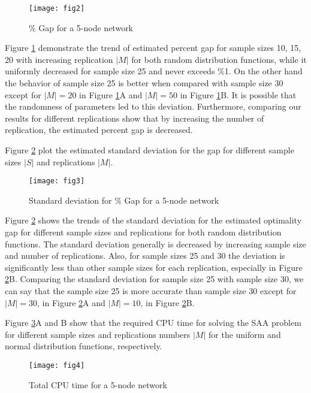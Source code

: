 \documentclass[review]{elsarticle}
\begin{document}
\begin{figure}[h!]
\centering
\texttt{[image: fig2]}
\caption{\% Gap for a 5-node network}\label{fig2}
\end{figure}


Figure \ref{fig2} demonstrate the trend of estimated percent gap for sample sizes 10, 15, 20 with increasing replication $|M|$ for both random distribution functions, while it uniformly decreased for sample size 25 and never exceeds \%1. On the other hand the behavior of sample size 25 is better when compared with sample size 30 except for $|M|=20$ in Figure \ref{fig2}A and $|M|=50$ in Figure \ref{fig2}B. It is possible that the randomness of parameters led to this deviation. Furthermore, comparing our results for different replications show that by increasing the number of replication, the estimated percent gap is decreased.

Figure \ref{fig3} plot the estimated standard deviation for the gap for different sample sizes $|S|$ and replications $|M|$.

\begin{figure}[h!]
\centering
\texttt{[image: fig3]}
\caption{Standard deviation for \% Gap for a 5-node network}\label{fig3}
\end{figure}

Figure \ref{fig3} shows the trends of the standard deviation for the estimated optimality gap for different sample sizes and replications for both random distribution functions. The standard deviation generally is decreased by increasing sample size and number of replications. Also, for sample sizes 25 and 30 the deviation is significantly less than other sample sizes for each replication, especially in Figure \ref{fig3}B. Comparing the standard deviation for sample size 25 with sample size 30, we can say that the sample size 25 is more accurate than sample size 30 except for $|M|=30$, in Figure \ref{fig3}A and $|M|=10$, in Figure \ref{fig3}B.

Figure \ref{fig4}A and B show that the required CPU time for solving the SAA problem for different sample sizes and replications numbers $|M|$ for the uniform and normal distribution functions, respectively.

\begin{figure}[h!]
\centering
\texttt{[image: fig4]}
\caption{Total CPU time for a 5-node network}\label{fig4}
\end{figure}
\end{document}
